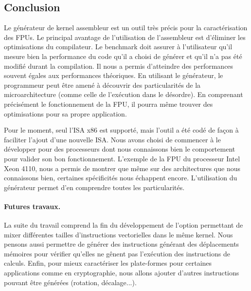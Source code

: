         
        




    
    



    

\subsection{Conclusion}
    
    Le générateur de kernel assembleur est un outil très précis pour la caractérisation des FPUs. Le principal avantage de l'utilisation de l'assembleur est d'éliminer les optimisations du compilateur. Le benchmark doit assurer à l'utilisateur qu'il mesure bien la performance du code qu'il a choisi de générer et qu'il n'a pas été modifié durant la compilation. Il nous a permis d'atteindre des performances souvent égales aux performances théoriques. En utilisant le générateur, le programmeur peut être amené à découvrir des particularités de la microarchitecture (comme celle de l'exécution dans le désordre). En comprenant précisément le fonctionnement de la FPU, il pourra même trouver des optimisations pour sa propre application.
    
    Pour le moment, seul l'ISA x86 est supporté, mais l'outil a été codé de façon à faciliter l'ajout d'une nouvelle ISA. Nous avons choisi de commencer à le développer pour des processeurs dont nous connaissons bien le comportement pour valider son bon fonctionnement. L'exemple de la FPU du processeur Intel Xeon 4110, nous a permis de montrer que même sur des architectures que nous connaissons bien, certaines spécificités nous échappent encore. L'utilisation du générateur permet d'en comprendre toutes les particularités.
    
    
    \paragraph{Futures travaux.} La suite du travail comprend la fin du développement de l'option permettant de mixer différentes tailles d'instructions vectorielles dans le même kernel. Nous pensons aussi permettre de générer des instructions générant des déplacements mémoires pour vérifier qu'elles ne gênent pas l'exécution des instructions de calculs. Enfin, pour mieux caractériser les plate-formes pour certaines applications comme en cryptographie, nous allons ajouter d'autres instructions pouvant être générées (rotation, décalage...).